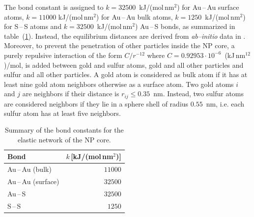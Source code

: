 The bond constant is assigned to $k = 32500$~kJ/(mol\,nm$^2$) for Au\,--\,Au surface atoms, $k = 11000$ 
kJ/(mol\,nm$^2$) for Au\,--\,Au bulk atoms, $k = 1250$~kJ/(mol\,nm$^2$) for S\,--\,S atoms and 
$k = 32500$~kJ/(mol\,nm$^2$) Au\,--\,S bonds, as summarized in table~(\ref{tab:NPConstants}). Instead, the 
equilibrium distances are derived from \textit{ab--initio} data in \cite{clusterEquilibrium}. Moreover, to 
prevent the penetration of other particles inside the \ac{NP} core, a purely repulsive interaction of the form 
$C/r^{-12}$ where $C = 0.92953\cdot 10^{-6}$~(kJ\,nm$^{12}$)/mol, is added between gold and sulfur atoms, gold 
and all other particles and sulfur and all other particles. A gold atom is considered as bulk atom if it has at 
least nine gold atom neighbors otherwise as a surface atom. Two gold atoms $i$ and $j$ are neighbors if their 
distance is $r_{ij} \le 0.35$~nm. Instead, two sulfur atoms are considered neighbors if they lie in a sphere 
shell of radius $0.55$~nm, i.e. each sulfur atom has at least five neighbors.
\begin{table}[h!t]
	\centering
	\begin{tabular}{lr}
		\toprule
		Bond			 	& $k$\,\footnotesize[kJ/(mol\,nm$^2$)] \\ \toprule
		Au\,--\,Au (bulk) 	& $11000$ 	\\ \midrule
		Au\,--\,Au (surface)& $32500$ 	\\ \midrule
		Au\,--\,S			& $32500$ 	\\ \midrule
		S\,--\,S			& $1250$ 	\\ \bottomrule
	\end{tabular}
	\caption{Summary of the bond constants for the elastic network of the \acs{NP} core.}
	\label{tab:NPConstants}
\end{table}

